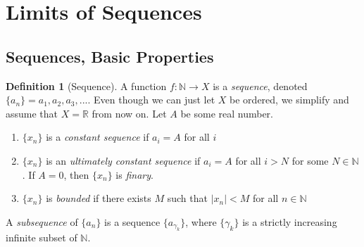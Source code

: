 \documentclass{article}
\theoremstyle{remark}
\theoremstyle{definition}
\newtheorem{definition}{Definition}[section]
\begin{document}
\section{Limits of Sequences}
\subsection{Sequences, Basic Properties}
\begin{definition}[Sequence]
A function $f: \mathbb{N} \longrightarrow X$ is a \textit{sequence}, denoted $\{a_n\} = a_1, a_2, a_3, ...$. Even though we can just let $X$ be ordered, we simplify and assume that $X = \mathbb{R}$ from now on. Let $A$ be some real number. 
\begin{enumerate}
    \item $\{x_n\}$ is a \textit{constant sequence} if $a_i = A$ for all $i$
    \item $\{x_n\}$ is an \textit{ultimately constant sequence} if $a_i = A$ for all $i > N$ for some $N \in \mathbb{N}$. If $A = 0$, then $\{x_n\}$ is \textit{finary}.
    \item $\{x_n\}$ is \textit{bounded} if there exists $M$ such that $|x_n| < M$ for all $n \in \mathbb{N}$
\end{enumerate}
A \textit{subsequence} of $\{ a_n\}$ is a sequence $\{a_{\gamma_k}\}$, where $\{\gamma_k\}$ is a strictly increasing infinite subset of $\mathbb{N}$. 
\end{definition}
\end{document}
